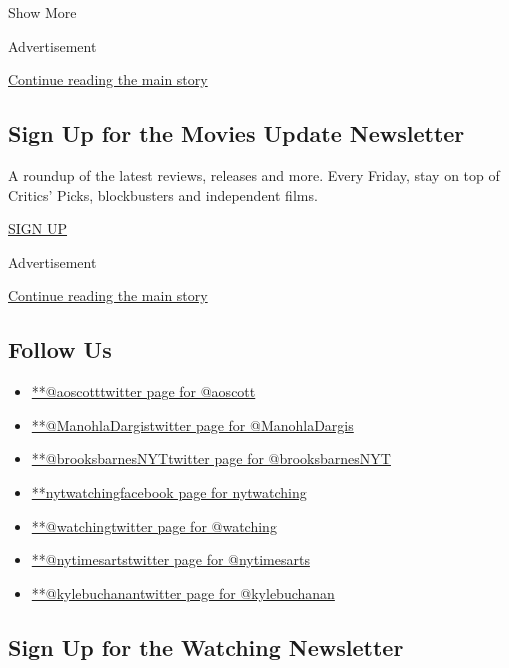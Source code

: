 Show More

Advertisement

\protect\hyperlink{after-mid2}{Continue reading the main story}

\hypertarget{sign-up-for-the-movies-update-newsletter}{%
\subsection{Sign Up for the Movies Update
Newsletter}\label{sign-up-for-the-movies-update-newsletter}}

A roundup of the latest reviews, releases and more. Every Friday, stay
on top of Critics' Picks, blockbusters and independent films.

\href{/newsletters/signup/FM}{SIGN UP}

Advertisement

\protect\hyperlink{after-mktg}{Continue reading the main story}

\hypertarget{follow-us}{%
\subsection{Follow Us}\label{follow-us}}

\begin{itemize}
\tightlist
\item
  \href{https://twitter.com/aoscott}{**@aoscotttwitter page for
  @aoscott}
\item
  \href{https://twitter.com/ManohlaDargis}{**@ManohlaDargistwitter page
  for @ManohlaDargis}
\item
  \href{https://twitter.com/brooksbarnesNYT}{**@brooksbarnesNYTtwitter
  page for @brooksbarnesNYT}
\item
  \href{https://www.facebook.com/nytwatching}{**nytwatchingfacebook page
  for nytwatching}
\item
  \href{https://twitter.com/watching}{**@watchingtwitter page for
  @watching}
\item
  \href{https://twitter.com/nytimesarts}{**@nytimesartstwitter page for
  @nytimesarts}
\item
  \href{https://twitter.com/kylebuchanan}{**@kylebuchanantwitter page
  for @kylebuchanan}
\end{itemize}

\hypertarget{sign-up-for-the-watching-newsletter}{%
\subsection{Sign Up for the Watching
Newsletter}\label{sign-up-for-the-watching-newsletter}}

